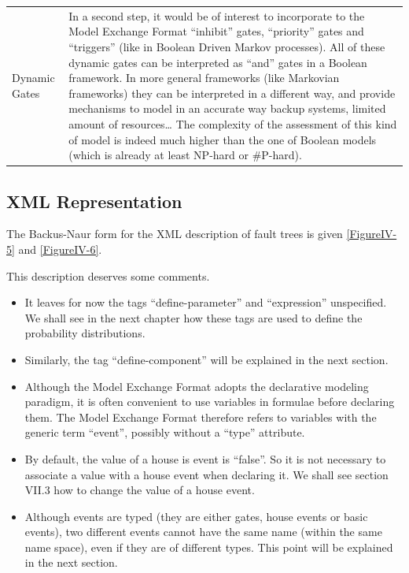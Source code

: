 \documentclass[11pt]{article}
\begin{document}
\begin{center}
\begin{tabular}{ll}
Dynamic Gates & In a second step, it would be of interest to incorporate to the Model Exchange Format ``inhibit'' gates, ``priority'' gates and ``triggers'' (like in Boolean Driven Markov processes). All of these dynamic gates can be interpreted as ``and'' gates in a Boolean framework. In more general frameworks (like Markovian frameworks) they can be interpreted in a different way, and provide mechanisms to model in an accurate way backup systems, limited amount of resources\ldots{} The complexity of the assessment of this kind of model is indeed much higher than the one of Boolean models (which is already at least NP-hard or \#P-hard).\\
\end{tabular}
\end{center}






\subsection{XML Representation}
\label{sec:orgf99aaba}

The Backus-Naur form for the XML description of fault trees is given
\ref{FigureIV-5} and \ref{FigureIV-6}.

This description deserves some comments.

\begin{itemize}
\item It leaves for now the tags ``define-parameter'' and ``expression''
unspecified. We shall see in the next chapter how these tags are used
to define the probability distributions.

\item Similarly, the tag ``define-component'' will be explained in the next
section.

\item Although the Model Exchange Format adopts the declarative modeling
paradigm, it is often convenient to use variables in formulae before
declaring them. The Model Exchange Format therefore refers to
variables with the generic term ``event'', possibly without a ``type''
attribute.

\item By default, the value of a house is event is ``false''. So it is not
necessary to associate a value with a house event when declaring it.
We shall see section VII.3 how to change the value of a house event.

\item Although events are typed (they are either gates, house events or
basic events), two different events cannot have the same name (within
the same name space), even if they are of different types. This point
will be explained in the next section.
\end{itemize}
\end{document}
